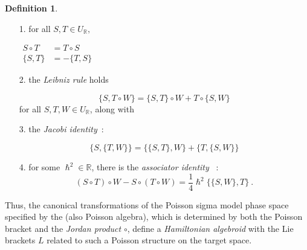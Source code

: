 \documentclass[12pt]{article}
\theoremstyle{plain}
\theoremstyle{definition}
\newtheorem{definition}{Definition}[section]
\numberwithin{equation}{section}
\newcommand{\bR}{\mathbb{R}}
\begin{document}
\begin{definition}
\begin{itemize}
\item[1.] for all $S, T \in U_{\bR},$

$\begin{aligned} S \circ T & = T \circ S \\ \{S, T \} &= - \{T,
S\} \end{aligned}$

\item[2.] the \emph{Leibniz rule} holds

$$ \{S, T \circ W \} = \{S, T\} \circ W + T \circ \{S, W\}$$
for all $S, T, W \in U_{\bR}$, along with

\item[3.] the \emph{Jacobi identity}~:

 $$ \{S, \{T, W \}\} = \{\{S,T \}, W\} + \{T, \{S, W \}\}$$

\item[4.] for some $\hslash^2 \in \bR$, there is the \emph{associator identity} ~:
$$(S \circ T) \circ W - S \circ (T \circ W) = \frac{1}{4} \hslash^2 \{\{S, W \}, T \}~.$$
\end{itemize}
 
 Thus, the canonical transformations of the Poisson sigma model phase space specified by the  (also Poisson algebra), which is determined by both the Poisson bracket and the \emph{Jordan product} $\circ$,  define a \emph{Hamiltonian algebroid} with the Lie brackets $L$ related to such a Poisson structure on the target space. 
\end{definition}
\end{document}
